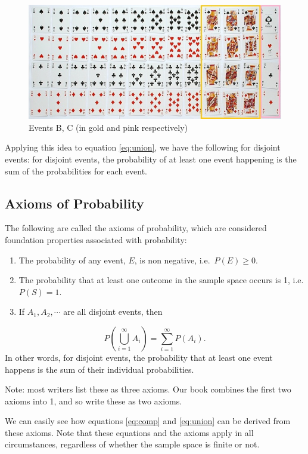\documentclass[
]{book}
\providecommand{\tightlist}{%
  \setlength{\itemsep}{0pt}\setlength{\parskip}{0pt}}
\begin{document}
\begin{figure}
\centering
\includegraphics{images/02-cardsBC.jpg}
\caption{\label{fig:cardsBC}Events B, C (in gold and pink respectively)}
\end{figure}

Applying this idea to equation \eqref{eq:union}, we have the following for disjoint events: for disjoint events, the probability of at least one event happening is the sum of the probabilities for each event.

\subsection{Axioms of Probability}\label{axioms-of-probability}

The following are called the axioms of probability, which are considered foundation properties associated with probability:

\begin{enumerate}
\def\labelenumi{\arabic{enumi}.}
\tightlist
\item
  The probability of any event, \(E\), is non negative, i.e.~\(P(E) \geq 0\).
\item
  The probability that at least one outcome in the sample space occurs is 1, i.e.\(P(S) = 1\).
\item
  If \(A_1, A_2, \cdots\) are all disjoint events, then
\end{enumerate}

\[
P(\bigcup\limits_{i=1}^{\infty} A_{i}) = \sum_{i=1}^{\infty} P(A_i).
\]
In other words, for disjoint events, the probability that at least one event happens is the sum of their individual probabilities.

Note: most writers list these as three axioms. Our book combines the first two axioms into 1, and so write these as two axioms.

We can easily see how equations \eqref{eq:comp} and \eqref{eq:union} can be derived from these axioms. Note that these equations and the axioms apply in all circumstances, regardless of whether the sample space is finite or not.
\end{document}
